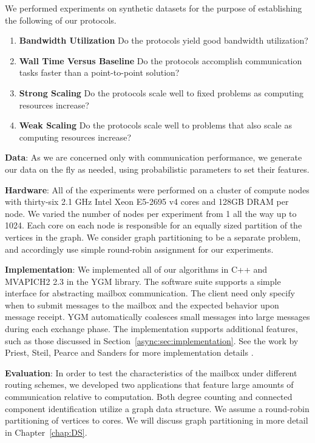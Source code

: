 \documentclass[10]{report}
\begin{document}
We performed experiments on synthetic datasets for the purpose of establishing the following of our protocols.
\begin{enumerate}
	\item \textbf{Bandwidth Utilization} Do the protocols yield good bandwidth utilization?
	\item \textbf{Wall Time Versus Baseline} Do the protocols accomplish communication tasks faster than a point-to-point solution?
	\item \textbf{Strong Scaling} Do the protocols scale well to fixed problems as computing resources increase?
	\item \textbf{Weak Scaling} Do the protocols scale well to problems that also scale as computing resources increase?
\end{enumerate}

\noindent
\textbf{Data}: 
As we are concerned only with communication performance, we generate our data on the fly as needed, using probabilistic parameters to set their features.

\noindent
\textbf{Hardware}: 
All of the experiments were performed on a cluster of compute nodes with thirty-six 2.1 GHz Intel Xeon E5-2695 v4 cores and 128GB DRAM per node. 
We varied the number of nodes per experiment from 1 all the way up to 1024.
Each core on each node is responsible for an equally sized partition of the vertices in the graph.
We consider graph partitioning to be a separate problem, and accordingly use simple round-robin assignment for our experiments.

\noindent
\textbf{Implementation}:
We implemented all of our algorithms in C++ and MVAPICH2 2.3 in the YGM library. 
The software suite supports a simple interface for abstracting mailbox communication.
The client need only specify when to submit messages to the mailbox and the expected behavior upon message receipt. 
YGM automatically coalesces small messages into large messages during each exchange phase.
The implementation supports additional features, such as those discussed in Section~\ref{async:sec:implementation}.
See the work by Priest, Steil, Pearce and Sanders for more implementation details \cite{priest2019you}.

\noindent
\textbf{Evaluation}:
In order to test the characteristics of the mailbox under different routing schemes, we developed two applications that feature large amounts of communication relative to computation.
Both degree counting and connected component identification utilize a graph data structure. 
We assume a round-robin partitioning of vertices to cores. 
We will discuss graph partitioning in more detail in Chapter~\ref{chap:DS}.
\end{document}
